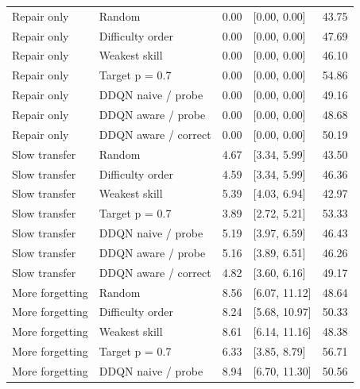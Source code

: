 \documentclass[preprint,11pt,authoryear]{elsarticle}
\begin{document}
\begin{longtable}{p{}p{}p{}p{}p{}}
Repair only & Random & 0.00 & [0.00, 0.00] & 43.75\\

Repair only & Difficulty order & 0.00 & [0.00, 0.00] & 47.69\\

Repair only & Weakest skill & 0.00 & [0.00, 0.00] & 46.10\\

Repair only & Target p = 0.7 & 0.00 & [0.00, 0.00] & 54.86\\

Repair only & DDQN naive / probe & 0.00 & [0.00, 0.00] & 49.16\\

Repair only & DDQN aware / probe & 0.00 & [0.00, 0.00] & 48.68\\

Repair only & DDQN aware / correct & 0.00 & [0.00, 0.00] & 50.19\\

Slow transfer & Random & 4.67 & [3.34, 5.99] & 43.50\\

Slow transfer & Difficulty order & 4.59 & [3.34, 5.99] & 46.36\\

Slow transfer & Weakest skill & 5.39 & [4.03, 6.94] & 42.97\\

Slow transfer & Target p = 0.7 & 3.89 & [2.72, 5.21] & 53.33\\

Slow transfer & DDQN naive / probe & 5.19 & [3.97, 6.59] & 46.43\\

Slow transfer & DDQN aware / probe & 5.16 & [3.89, 6.51] & 46.26\\

Slow transfer & DDQN aware / correct & 4.82 & [3.60, 6.16] & 49.17\\

More forgetting & Random & 8.56 & [6.07, 11.12] & 48.64\\

More forgetting & Difficulty order & 8.24 & [5.68, 10.97] & 50.33\\

More forgetting & Weakest skill & 8.61 & [6.14, 11.16] & 48.38\\

More forgetting & Target p = 0.7 & 6.33 & [3.85, 8.79] & 56.71\\

More forgetting & DDQN naive / probe & 8.94 & [6.70, 11.30] & 50.56\\


\end{longtable}
\end{document}
